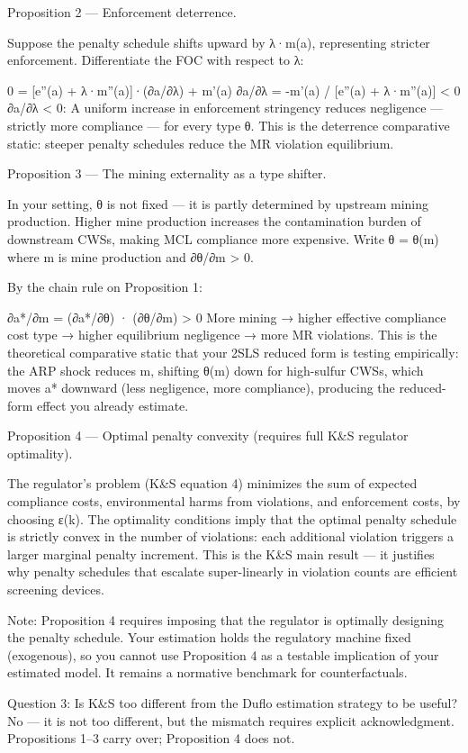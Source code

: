 Proposition 2 — Enforcement deterrence.

Suppose the penalty schedule shifts upward by λ·m(a), representing stricter enforcement. Differentiate the FOC with respect to λ:


0 = [e''(a) + λ·m''(a)]·(∂a/∂λ) + m'(a)
∂a/∂λ = -m'(a) / [e''(a) + λ·m''(a)] < 0
∂a/∂λ < 0: A uniform increase in enforcement stringency reduces negligence — strictly more compliance — for every type θ. This is the deterrence comparative static: steeper penalty schedules reduce the MR violation equilibrium.

Proposition 3 — The mining externality as a type shifter.

In your setting, θ is not fixed — it is partly determined by upstream mining production. Higher mine production increases the contamination burden of downstream CWSs, making MCL compliance more expensive. Write θ = θ(m) where m is mine production and ∂θ/∂m > 0.

By the chain rule on Proposition 1:


∂a*/∂m = (∂a*/∂θ) · (∂θ/∂m) > 0
More mining → higher effective compliance cost type → higher equilibrium negligence → more MR violations. This is the theoretical comparative static that your 2SLS reduced form is testing empirically: the ARP shock reduces m, shifting θ(m) down for high-sulfur CWSs, which moves a* downward (less negligence, more compliance), producing the reduced-form effect you already estimate.

Proposition 4 — Optimal penalty convexity (requires full K&S regulator optimality).

The regulator's problem (K&S equation 4) minimizes the sum of expected compliance costs, environmental harms from violations, and enforcement costs, by choosing ε(k). The optimality conditions imply that the optimal penalty schedule is strictly convex in the number of violations: each additional violation triggers a larger marginal penalty increment. This is the K&S main result — it justifies why penalty schedules that escalate super-linearly in violation counts are efficient screening devices.

Note: Proposition 4 requires imposing that the regulator is optimally designing the penalty schedule. Your estimation holds the regulatory machine fixed (exogenous), so you cannot use Proposition 4 as a testable implication of your estimated model. It remains a normative benchmark for counterfactuals.

Question 3: Is K&S too different from the Duflo estimation strategy to be useful?
No — it is not too different, but the mismatch requires explicit acknowledgment. Propositions 1–3 carry over; Proposition 4 does not.

